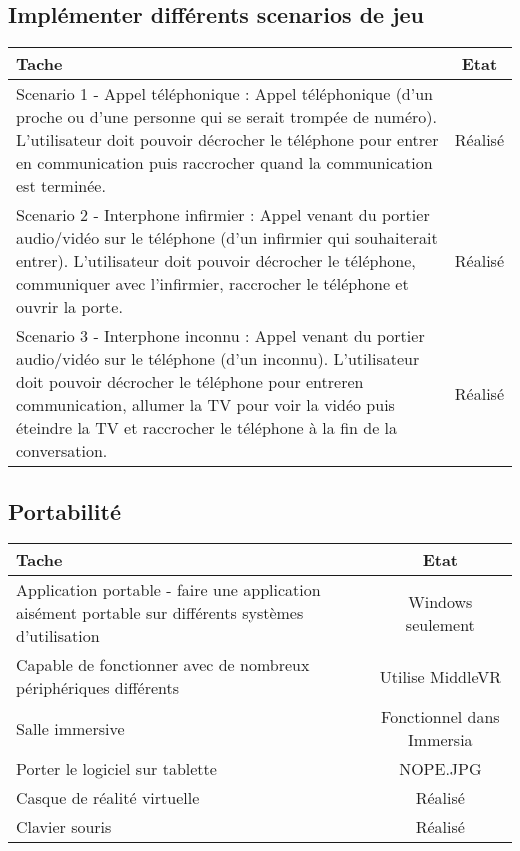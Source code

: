 \subsection{Implémenter différents scenarios de jeu}		
\begin{tabular}{|p{13cm}|c|}
	\hline
	Tache & Etat \\ \hline
	Scenario 1 - Appel téléphonique : Appel téléphonique (d'un proche ou d'une personne qui se serait trompée de numéro). L'utilisateur doit pouvoir décrocher le téléphone pour entrer en communication puis raccrocher quand la communication est terminée. & Réalisé \\ \hline
	Scenario 2 - Interphone infirmier : Appel venant du portier audio/vidéo sur le téléphone (d'un infirmier qui souhaiterait entrer). L'utilisateur doit pouvoir décrocher le téléphone, communiquer avec l'infirmier, raccrocher le téléphone et ouvrir la porte.& Réalisé \\ \hline
	Scenario 3 - Interphone inconnu : Appel venant du portier audio/vidéo sur le téléphone (d'un inconnu). L'utilisateur doit pouvoir décrocher le téléphone pour entreren communication, allumer la TV pour voir la vidéo puis éteindre la TV et raccrocher le téléphone à la fin de la conversation.& Réalisé \\ \hline
\end{tabular}
		

\subsection{Portabilité}
\hspace*{-1cm}
	\begin{tabular}{|p{13cm}|c|}
		\hline
		Tache & Etat \\ \hline
		Application portable - faire une application aisément portable sur différents systèmes d'utilisation & Windows seulement \\ \hline
		Capable de fonctionner avec de nombreux périphériques différents & Utilise MiddleVR \\ \hline
		Salle immersive & Fonctionnel dans Immersia \\ \hline
		Porter le logiciel sur tablette  & NOPE.JPG \\ \hline
		Casque de réalité virtuelle & Réalisé \\ \hline
		Clavier souris & Réalisé \\ \hline
	\end{tabular}
\hspace*{-1cm}
